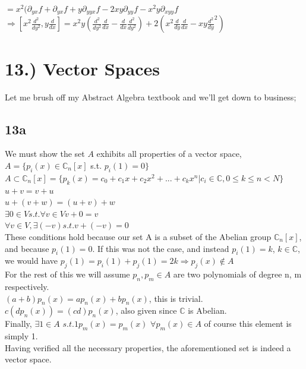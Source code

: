 \documentclass[10pt]{article}
\begin{document}
$=x^2(\partial_{yx}f+\partial_{yx}f+y\partial_{yyx}f-2xy\partial_{yy}f-x^2y\partial_{xyy}f$\\

$\Rightarrow[x^2\frac{d^2}{dy^2},y\frac{d}{dx}]=x^2y(\frac{d^2}{dy^2}\frac{d}{dx}-\frac{d}{dx}\frac{d^2}{dy^2})+2(x^2\frac{d}{dy}\frac{d}{dx}-xy\frac{d^2}{dy}^2)$\\

\section*{13.) Vector Spaces}
Let me brush off my Abstract Algebra textbook and we'll get down to business;
\subsection*{13a}
We must show the set $A$ exhibits all properties of a vector space, $A=\{p_i(x)\in\mathbb{C}_n[x]$ s.t. $p_i(1)=0\}$\\

$A\subset\mathbb{C}_n[x]=\{p_k(x)=c_0+c_1x+c_2x^2+...+c_kx^n|c_i\in\mathbb{C},0\leq k\leq n<N\}$\\

$u+v=v+u$\\
$u+(v+w)=(u+v)+w$\\
$\exists 0\in V s.t. \forall v\in V v+0=v$\\
$\forall v\in V, \exists(-v) s.t. v+(-v)=0$\\

These conditions hold because our set A is a subset of the Abelian group $\mathbb{C}_n[x]$, and because $p_i(1)=0$. If this was not the case, and instead $p_i(1)=k$, $k\in\mathbb{C}$, we would have
$p_j(1)=p_i(1)+p_j(1)=2k\Rightarrow p_j(x)\not\in A$\\

For the rest of this we will assume $p_n,p_m\in A$ are two polynomials of degree n, m respectively.\\
$(a+b)p_n(x)=ap_n(x)+bp_n(x)$, this is trivial.\\
$c(dp_n(x))=(cd)p_n(x)$, also given since $\mathbb{C}$ is Abelian.\\

Finally, $\exists 1\in A$ $s.t. 1p_m(x)=p_m(x)$  $\forall p_m(x)\in A$ of course this element is simply 1.\\

Having verified all the necessary properties, the aforementioned set is indeed a vector space.\\
\end{document}
